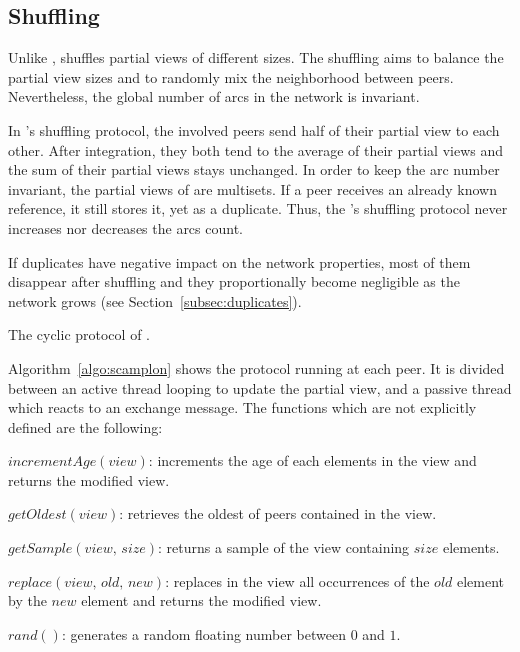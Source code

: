 \subsection{Shuffling}
\label{subsec:cyclic}

Unlike \CYCLON, \SPRAY shuffles partial views of different sizes. The shuffling
aims to balance the partial view sizes and to randomly mix the neighborhood
between peers. Nevertheless, the global number of arcs in the network is
invariant.

In \SPRAY's shuffling protocol, the involved peers send half of their partial
view to each other. After integration, they both tend to the average of their
partial views and the sum of their partial views stays unchanged. In order to
keep the arc number invariant, the partial views of \SPRAY are multisets. If a
peer receives an already known reference, it still stores it, yet as a
duplicate. Thus, the \SPRAY's shuffling protocol never increases nor decreases
the arcs count.

If duplicates have negative impact on the network properties, most of them
disappear after shuffling and they proportionally become negligible as the
network grows (see Section~\ref{subsec:duplicates}).

\begin{algorithm}[h]
  
  \caption{\label{algo:scamplon}The cyclic protocol of \SPRAY.}
\end{algorithm}

Algorithm~\ref{algo:scamplon} shows the \SPRAY protocol running at each
peer. It is divided between an active thread looping to update the partial
view, and a passive thread which reacts to an exchange message. The functions
which are not explicitly defined are the following:
\begin{compactitem}
\item $incrementAge(view)$: increments the age of each elements in the view
  and returns the modified view.
\item $getOldest(view)$: retrieves the oldest of peers contained in the view.
\item $getSample(view, \, size)$: returns a sample of the view containing
  $size$ elements.
\item $replace(view,\,old,\,new)$: replaces in the view all occurrences of
  the $old$ element by the $new$ element and returns the modified view.
\item $rand()$: generates a random floating number between $0$ and $1$.
\end{compactitem}

